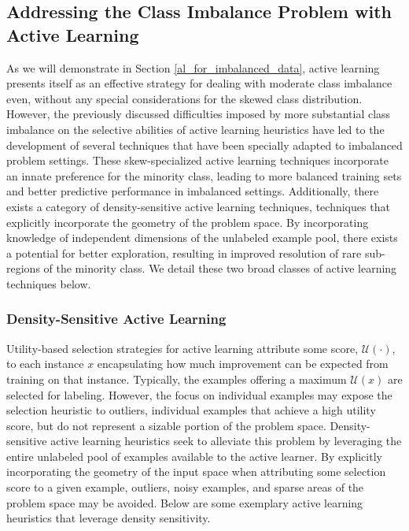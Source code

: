 \subsection{Addressing the Class Imbalance Problem with Active Learning}
As we will demonstrate in Section \ref{al_for_imbalanced_data}, active learning presents itself as an effective strategy for dealing with moderate class imbalance even, without any special considerations for the skewed class distribution. However, the previously discussed difficulties imposed by more substantial class imbalance on the selective abilities of active learning heuristics have led to the development of several techniques that have been specially adapted to imbalanced problem settings. These skew-specialized active learning techniques incorporate an innate preference for the minority class, leading to more balanced training sets and better predictive performance in imbalanced settings. Additionally, there exists a category of density-sensitive active learning techniques, techniques that explicitly incorporate the geometry of the problem space. By incorporating knowledge of independent dimensions of the unlabeled example pool, there exists a potential for better exploration, resulting in improved resolution of rare sub-regions of the minority class. We detail these two broad classes of active learning techniques below.

\subsubsection{Density-Sensitive Active Learning}

Utility-based selection strategies for active learning attribute some score, $\mathcal{U}(\cdot)$, to each instance $x$ encapsulating how much improvement can be expected from training on that instance. Typically, the examples offering a maximum $\mathcal{U}(x)$ are selected for labeling. However, the focus on individual examples may expose the selection heuristic to outliers, individual examples that achieve a high utility score, but do not represent a sizable portion of the problem space. Density-sensitive active learning heuristics seek to alleviate this problem by leveraging the entire unlabeled pool of examples available to the active learner. By explicitly incorporating the geometry of the input space when attributing some selection score to a given example, outliers, noisy examples, and sparse areas of the problem space may be avoided. Below are some exemplary active learning heuristics that leverage density sensitivity.

